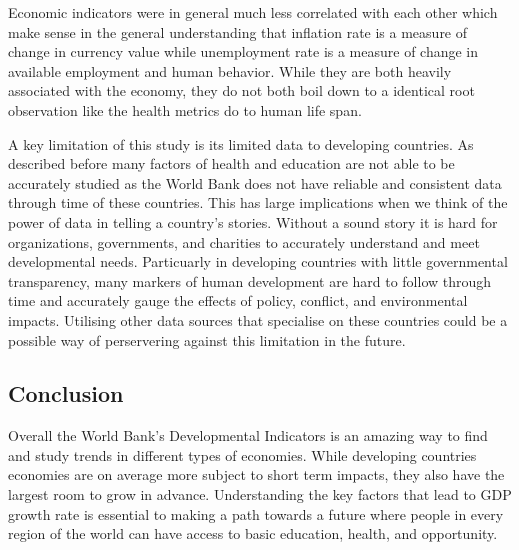 \documentclass[
  letterpaper,
  DIV=11,
  numbers=noendperiod]{scrartcl}
\begin{document}
Economic indicators were in general much less correlated with each other
which make sense in the general understanding that inflation rate is a
measure of change in currency value while unemployment rate is a measure
of change in available employment and human behavior. While they are
both heavily associated with the economy, they do not both boil down to
a identical root observation like the health metrics do to human life
span.

A key limitation of this study is its limited data to developing
countries. As described before many factors of health and education are
not able to be accurately studied as the World Bank does not have
reliable and consistent data through time of these countries. This has
large implications when we think of the power of data in telling a
country's stories. Without a sound story it is hard for organizations,
governments, and charities to accurately understand and meet
developmental needs. Particuarly in developing countries with little
governmental transparency, many markers of human development are hard to
follow through time and accurately gauge the effects of policy,
conflict, and environmental impacts. Utilising other data sources that
specialise on these countries could be a possible way of perservering
against this limitation in the future.

\subsection{Conclusion}\label{conclusion}

Overall the World Bank's Developmental Indicators is an amazing way to
find and study trends in different types of economies. While developing
countries economies are on average more subject to short term impacts,
they also have the largest room to grow in advance. Understanding the
key factors that lead to GDP growth rate is essential to making a path
towards a future where people in every region of the world can have
access to basic education, health, and opportunity.
\end{document}
